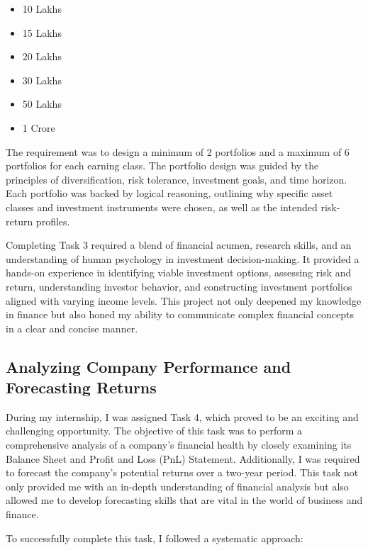 \begin{enumerate}
\begin{itemize}
    \item 10 Lakhs
    \item 15 Lakhs
    \item 20 Lakhs
    \item 30 Lakhs
    \item 50 Lakhs
    \item 1 Crore
\end{itemize}

The requirement was to design a minimum of 2 portfolios and a maximum of 6 portfolios for each earning class. The portfolio design was guided by the principles of diversification, risk tolerance, investment goals, and time horizon. Each portfolio was backed by logical reasoning, outlining why specific asset classes and investment instruments were chosen, as well as the intended risk-return profiles.
\end{enumerate}
Completing Task 3 required a blend of financial acumen, research skills, and an understanding of human psychology in investment decision-making. It provided a hands-on experience in identifying viable investment options, assessing risk and return, understanding investor behavior, and constructing investment portfolios aligned with varying income levels. This project not only deepened my knowledge in finance but also honed my ability to communicate complex financial concepts in a clear and concise manner.

\subsection{Analyzing Company Performance and Forecasting Returns}

During my internship, I was assigned Task 4, which proved to be an exciting and challenging opportunity. The objective of this task was to perform a comprehensive analysis of a company's financial health by closely examining its Balance Sheet and Profit and Loss (PnL) Statement. Additionally, I was required to forecast the company's potential returns over a two-year period. This task not only provided me with an in-depth understanding of financial analysis but also allowed me to develop forecasting skills that are vital in the world of business and finance.

To successfully complete this task, I followed a systematic approach:


